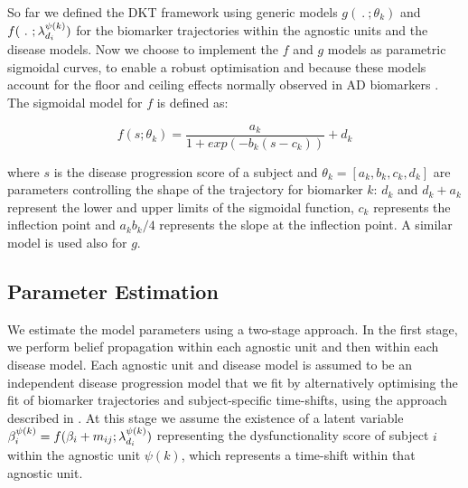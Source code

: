 \documentclass{llncs}
\begin{document}
So far we defined the DKT framework using generic models $g(\ .\ ; \theta_k)$ and $f(\ .\ ; \lambda_{d_i}^{\psi(k)})$ for the biomarker trajectories within the agnostic units and the disease models. Now we choose to implement the $f$ and $g$ models as parametric sigmoidal curves, to enable a robust optimisation and because these models account for the floor and ceiling effects normally observed in AD biomarkers \cite{sabuncu2011dynamics}. The sigmoidal model for $f$ is defined as:

\begin{equation}
 f(s;\theta_k) = \frac{a_k}{1+exp(-b_k(s-c_k))} + d_k
\end{equation}

where $s$ is the disease progression score of a subject and $\theta_k = [a_k, b_k, c_k, d_k]$ are parameters controlling the shape of the trajectory for biomarker $k$: $d_k$ and $d_k + a_k$ represent the lower and upper limits of the sigmoidal function, $c_k$ represents the inflection point and $a_k b_k/4$ represents the slope at the inflection point. A similar model is used also for $g$.


\subsection{Parameter Estimation}

\newcommand{\uu}{^{(u)}}
\newcommand{\um}{^{(u-1)}}

We estimate the model parameters using a two-stage approach. In the first stage, we perform belief propagation within each agnostic unit and then within each disease model. Each agnostic unit and disease model is assumed to be an independent disease progression model that we fit by alternatively optimising the fit of biomarker trajectories and subject-specific time-shifts, using the approach described in \cite{jedynak2012computational}. At this stage we assume the existence of a latent variable $\beta_i^{\psi(k)} = f(\beta_i + m_{ij}; \lambda_{d_i}^{\psi(k)})$ representing the dysfunctionality score of subject $i$ within the agnostic unit $\psi(k)$, which represents a time-shift within that agnostic unit.
\end{document}
